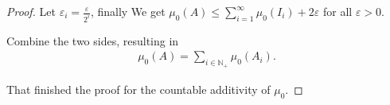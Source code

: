 \begin{proof}[Proof]
   Let $\varepsilon _i = \frac{\varepsilon}{2^i}$, finally We get $\mu_0(A) \le \sum _{i=1}^\infty \mu_0(I_i) + 2\varepsilon $ for all $\varepsilon > 0$.

   Combine the two sides, resulting in 
    \begin{align*}
        \mu_0(A) = \sum _{i\in\mathbb{N} _+} \mu_0(A_i)
    .\end{align*}

    That finished the proof for the countable additivity of $\mu_0$.

\end{proof}



